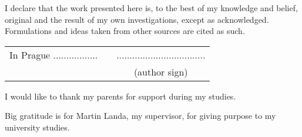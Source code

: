 \newcommand{\odsaditodzhora}{\hskip1pt\vfill}

\odsaditodzhora
{}

 \baselineskip

I declare that the work presented here is, to the best of my knowledge and
belief, original and the result of my own investigations, except as acknowledged.
Formulations and ideas taken from other sources are cited as such.

\begin{flushleft}
\begin{tabular}{cp{}c}
In Prague .................
& 
&
..................................
\\
&&
(author sign)
\end{tabular}

\end{flushleft}
\newpage

\odsaditodzhora
{}

 \baselineskip

I would like to thank my parents for support during my studies. 
 
Big gratitude is for Martin Landa, my supervisor, for giving purpose to my university studies. 
\newpage
